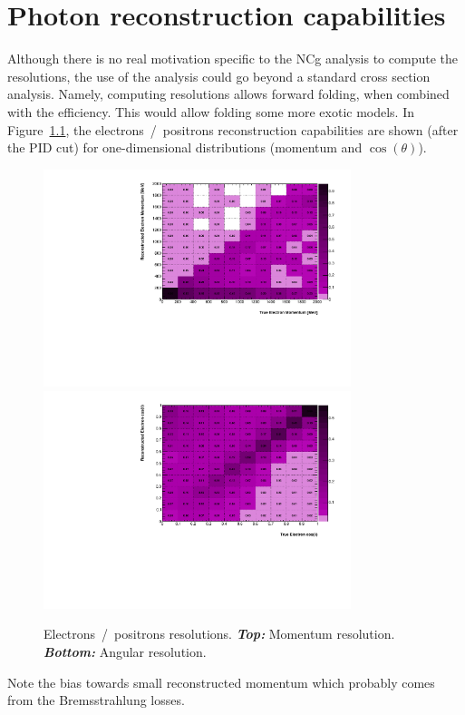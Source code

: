 \chapter{Photon reconstruction capabilities}
\label{app:rec}
Although there is no real motivation specific to the \Gls{NCg}
analysis to compute the resolutions, the use of the analysis could go
beyond a standard cross section analysis. Namely, computing
resolutions allows forward folding, when combined with the
efficiency. This would allow folding some more exotic models. In
Figure~\ref{fig:elecrecon}, the electrons~/~positrons reconstruction
capabilities are shown (after the \Gls{PID} cut) for one-dimensional
distributions (momentum and $\cos(\theta)$).

\begin{figure}[ht]
  \center
  \includegraphics[width=0.8\textwidth]{T2K-TN-254/images/resol/0_MomResolutionElecton.pdf} \\
  \includegraphics[width=0.8\textwidth]{T2K-TN-254/images/resol/1_CosResolutionElecton.pdf} 
  \caption[Electron~/~positron resolutions]{Electrons~/~positrons
    resolutions. \textbf{\textit{Top:}} Momentum
    resolution. \textbf{\textit{Bottom:}} Angular resolution.}
  \label{fig:elecrecon}
\end{figure}
Note the bias towards small reconstructed momentum which probably
comes from the Bremsstrahlung losses.

